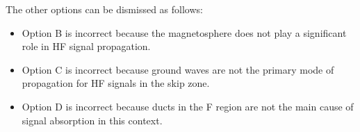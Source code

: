 The other options can be dismissed as follows:
\begin{itemize}
    \item Option B is incorrect because the magnetosphere does not play a significant role in HF signal propagation.
    \item Option C is incorrect because ground waves are not the primary mode of propagation for HF signals in the skip zone.
    \item Option D is incorrect because ducts in the F region are not the main cause of signal absorption in this context.
\end{itemize}


